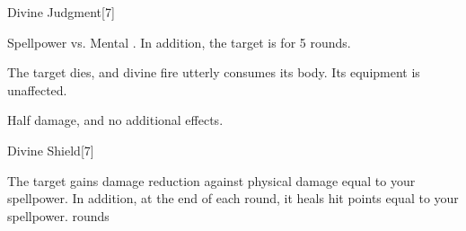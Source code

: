 \begin{spellsection}{Divine Judgment}[7]
    \begin{spellheader}
    \end{spellheader}
    \begin{spellcontent}
        \begin{spelltargetinginfo}
        \end{spelltargetinginfo}
        \begin{spelleffects}
            \begin{spellattack}{Spellpower vs. Mental}
                \spellsuccess {}. In addition, the target is \staggered for 5 rounds.

                \spellcritical The target dies, and divine fire utterly consumes its body. Its equipment is unaffected.

                \spellfailure Half damage, and no additional effects.
            \end{spellattack}
        \end{spelleffects}
    \end{spellcontent}
    \begin{spellfooter}
        \miscastrandom
    \end{spellfooter}
    \begin{spellaugments}
    \end{spellaugments}
\end{spellsection}

\begin{spellsection}{Divine Shield}[7]
    \begin{spellheader}
    \end{spellheader}
    \begin{spellcontent}
        \begin{spelltargetinginfo}
        \end{spelltargetinginfo}
        \begin{spelleffects}
            \spelleffect The target gains damage reduction against physical damage equal to your spellpower.
            In addition, at the end of each round, it heals hit points equal to your spellpower.
             rounds
        \end{spelleffects}
    \end{spellcontent}
    \begin{spellfooter}
        \miscastexplode
    \end{spellfooter}
\end{spellsection}

